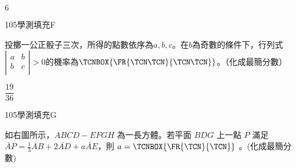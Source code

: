 \begin{QUESTIONS}
\begin{QUESTION}
        \begin{QANS}
            $6$
        \end{QANS}
        \begin{QSOLLIST}
        \end{QSOLLIST}
        \begin{QEMPTYSPACE}
        \end{QEMPTYSPACE}
    \end{QUESTION}
    \begin{QUESTION}
        \begin{ExamInfo}{105}{學測}{填充}{F}
        \end{ExamInfo}
        \begin{ExamAnsRateInfo}{17}{39}{10}{2}
        \end{ExamAnsRateInfo}
        \begin{QBODY}
            投擲一公正骰子三次，所得的點數依序為$a,b,c$。在$b$為奇數的條件下，行列式
			$\left| \begin{matrix}
			   a & b  \\
			   b & c  \\
			\end{matrix} \right|>0$的機率為$\TCNBOX{\FR{\TCN\TCN}{\TCN\TCN}}$。（化成最簡分數）
        \end{QBODY}
        \begin{QFROMS}
        \end{QFROMS}
        \begin{QTAGS}\end{QTAGS}
        \begin{QANS}
            $\dfrac{19}{36}$
        \end{QANS}
        \begin{QSOLLIST}
        \end{QSOLLIST}
        \begin{QEMPTYSPACE}
        \end{QEMPTYSPACE}
    \end{QUESTION}
    \begin{QUESTION}
        \begin{ExamInfo}{105}{學測}{填充}{G}
        \end{ExamInfo}
        \begin{ExamAnsRateInfo}{15}{38}{6}{1}
        \end{ExamAnsRateInfo}
        \begin{QBODY}
            \begin{LeftSide}[10cm]
				如右圖所示，$ABCD-EFGH$ 為一長方體。若平面 $BDG$ 上一點 $P$ 滿足 $\lvec{AP} = \frac{1}{3} \lvec{AB} + 2 \lvec{AD} + a \lvec{AE} $，則 $a= \TCNBOX {\FR{\TCN}{\TCN}}$ 。(化成最簡分數)

\end{LeftSide}
\end{QBODY}
\end{QUESTION}
\end{QUESTIONS}
